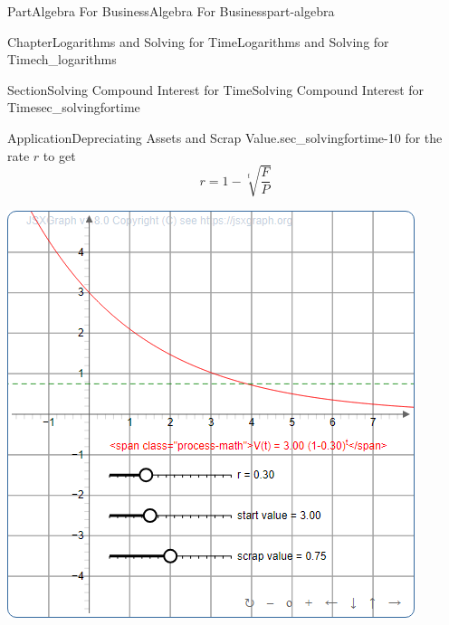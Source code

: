 \documentclass{tufte-book}
\numberwithin{equation}{chapter}
\begin{document}
\begin{partptx}{Part}{Algebra For Business}{}{Algebra For Business}{}{}{part-algebra}
\begin{chapterptx}{Chapter}{Logarithms and Solving for Time}{}{Logarithms and Solving for Time}{}{}{ch_logarithms}
\begin{sectionptx}{Section}{Solving Compound Interest for Time}{}{Solving Compound Interest for Time}{}{}{sec_solvingfortime}
\begin{insight}{Application}{Depreciating Assets and Scrap Value.}{sec_solvingfortime-10}
for the rate \(r\) to get%
\begin{equation*}
r = 1- \sqrt[t]{\frac{F}{P}}
\end{equation*}
%
\end{insight}
\begin{sidebyside}{2}{0.075}{0.075}{0.17}%
\begin{sbspanel}{0.47}%
\includegraphics[width=\linewidth]{generated/preview/interactive_depreciation-preview.png}
\end{sbspanel}%
\begin{sbspanel}{0.21}%

\end{sbspanel}
\end{sidebyside}
\end{sectionptx}
\end{chapterptx}
\end{partptx}
\end{document}

